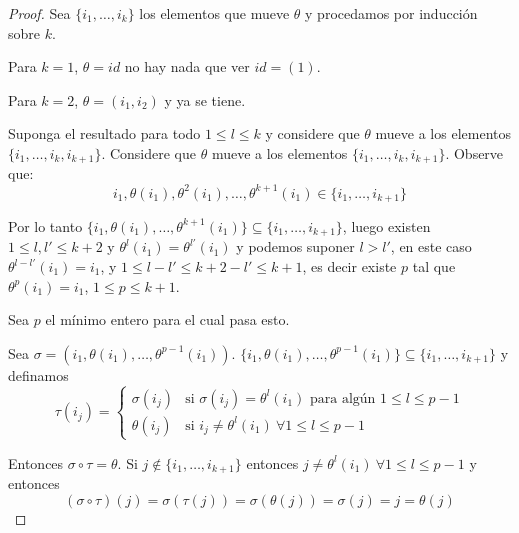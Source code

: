 
\begin{proof}
    Sea $\{i_1, \dots, i_k\}$ los elementos que mueve $\theta$ y procedamos por inducción sobre $k$.
    
    Para $k=1$, $\theta=id$ no hay nada que ver $id=(1)$.
    
    Para $k=2$, $\theta=(i_1, i_2)$ y ya se tiene.
    
    Suponga el resultado para todo $1 \leq l \leq k$ y considere que $\theta$ mueve a los elementos $\{i_1, \dots, i_k, i_{k+1}\}$. Considere que $\theta$ mueve a los elementos $\{i_1, \dots, i_k, i_{k+1}\}$. Observe que:
    \begin{equation*}
     i_1, \theta(i_1), \theta^2(i_1), \dots, \theta^{k+1}(i_1) \in \{i_1, \dots, i_{k+1}\}
    \end{equation*}
      
    Por lo tanto $\{i_1, \theta(i_1), \dots, \theta^{k+1}(i_1)\} \subseteq \{i_1, \dots, i_{k+1}\}$, luego existen $1 \leq l, l' \leq k+2$ y $\theta^l(i_1) = \theta^{l'}(i_1)$ y podemos suponer $l > l'$, en este caso $\theta^{l-l'}(i_1) = i_1$, y $1 \leq l-l' \leq k+2-l' \leq k+1$, es decir existe $p$ tal que $\theta^p(i_1) = i_1$, $1 \leq p \leq k+1$.
    
    Sea $p$ el mínimo entero para el cual pasa esto. \par Sea $\sigma = (i_1, \theta(i_1), \dots, \theta^{p-1}(i_1))$. 
    $\{i_1, \theta(i_1), \dots, \theta^{p-1}(i_1)\} \subseteq \{i_1, \dots, i_{k+1}\}$ y definamos
    \begin{equation*}
        \tau(i_j) = \begin{cases} 
            \sigma(i_j) & \text{si } \sigma(i_j) = \theta^l(i_1) \text{ para algún } 1 \leq l \leq p-1 \\
            \theta(i_j) & \text{si } i_j \neq \theta^l(i_1) \ \forall 1 \leq l \leq p-1
        \end{cases}
    \end{equation*}
    
    Entonces $\sigma \circ \tau = \theta$. Si $j \notin \{i_1, \dots, i_{k+1}\}$ entonces $j \neq \theta^l(i_1) \ \forall 1 \leq l \leq p-1$ y entonces
    \begin{equation*}
        (\sigma \circ \tau)(j) = \sigma(\tau(j)) = \sigma(\theta(j)) = \sigma(j) = j = \theta(j)
    \end{equation*}
    

\end{proof}
